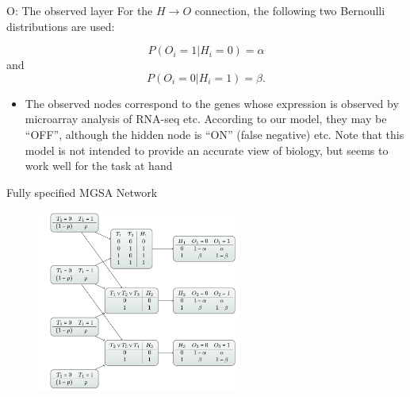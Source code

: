 \documentclass{beamer}
\begin{document}
\begin{frame}{O: The observed layer}
 For the $H \rightarrow O$
connection, the following two Bernoulli distributions are used:

\begin{equation}
P(O_i=1|H_i=0) = \alpha
\label{eq:mgsa-bernoulli-alpha}
\end{equation}
and
\begin{equation}
P(O_i=0|H_i=1) = \beta.
\label{eq:mgsa-bernoulli-beta}
\end{equation}
\begin{itemize}
 \item The observed nodes correspond to the genes whose expression is observed by microarray 
analysis of RNA-seq etc. According to our model, they may be ``OFF'', although the hidden node is 
``ON'' (false negative) etc. Note that this model is not intended to provide an accurate view of 
biology, but seems to work well for the task at hand
\end{itemize}

 
\end{frame}


\begin{frame}{Fully specified MGSA Network}
 \begin{figure}
 \centering
 \includegraphics[width=0.6\textwidth]{./img/fullyspecifiedMGSA.png}
\end{figure}

 
\end{frame}

\end{document}
